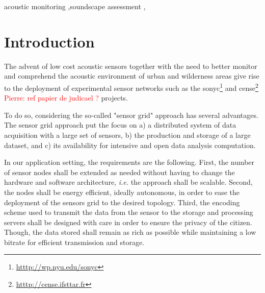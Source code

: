 \documentclass[final,3p,times,twocolumn]{elsarticle}
\newcommand{\pa}[1]{\textcolor{red}{ Pierre: #1}}
\begin{document}
\begin{frontmatter}
\begin{abstract}
\end{abstract}

\begin{keyword}

acoustic monitoring \sep soundscape assessment \sep



\end{keyword}

\end{frontmatter}

\clearpage
\section{Introduction}

The advent of low cost acoustic sensors together with the need to better monitor and comprehend the acoustic environment of urban and wilderness areas give rise to the deployment of experimental sensor networks such as the sonyc\footnote{\url{htttp://wp.nyu.edu/sonyc}} \cite{mydlarz2017implementation} and cense\footnote{\url{htttp://cense.ifsttar.fr}} \pa{ref papier de judicael ?} \cite{} projects.

To do so, considering the so-called "sensor grid" approach  \cite{lim2005sensor,tham2005sensorgrid} has several advantages. The sensor grid approach put the focus on a) a distributed system of data acquisition with a large set of sensors, b) the production and storage of a large dataset, and c) its availability for intensive and open data analysis computation.

In our application setting, the requirements are the following. First,  the number of sensor nodes shall be extended as needed without having to change the hardware and software architecture, \textit{i.e.} the approach shall be scalable. Second, the nodes shall be energy efficient, ideally autonomous, in order to ease the deployment of the sensors grid to the desired topology. Third, the encoding scheme used to transmit the data from the sensor to the storage and processing servers shall be designed with care in order to ensure the privacy of the citizen. Though, the data stored shall remain as rich as possible while maintaining a low bitrate for efficient transmission and storage.
\end{document}
